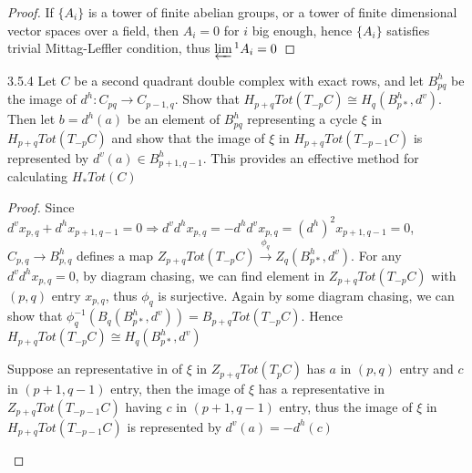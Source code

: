 \documentclass[../main.tex]{subfiles}
\begin{document}
\begin{proof}
If $\{A_i\}$ is a tower of finite abelian groups, or a tower of finite dimensional vector spaces over a field, then $A_i=0$ for $i$ big enough, hence $\{A_i\}$ satisfies trivial Mittag-Leffler condition, thus $\varprojlim\textstyle^1A_i=0$
\end{proof}

\begin{customexercise}{3.5.4}
Let $C$ be a second quadrant double complex with exact rows, and let $B^h_{pq}$ be the image of $d^h:C_{pq}\to C_{p-1,q}$. Show that $H_{p+q}Tot(T_{-p}C)\cong H_q(B^h_{p*},d^v)$. Then let $b=d^h(a)$ be an element of $B_{pq}^h$ representing a cycle $\xi$ in $H_{p+q}Tot(T_{-p}C)$ and show that the image of $\xi$ in $H_{p+q}Tot(T_{-p-1}C)$ is represented by $d^v(a)\in B^h_{p+1,q-1}$. This provides an effective method for calculating $H_*Tot(C)$
\end{customexercise}

\begin{proof}
Since $d^vx_{p,q}+d^hx_{p+1,q-1}=0\Rightarrow d^vd^hx_{p,q}=-d^hd^vx_{p,q}=(d^h)^2x_{p+1,q-1}=0$, $C_{p,q}\to B_{p,q}^h$ defines a map $Z_{p+q}Tot(T_{-p}C)\xrightarrow{\phi_q} Z_q(B^h_{p*},d^v)$. For any $d^vd^hx_{p,q}=0$, by diagram chasing, we can find element in $Z_{p+q}Tot(T_{-p}C)$ with $(p,q)$ entry $x_{p,q}$, thus $\phi_q$ is surjective. Again by some diagram chasing, we can show that $\phi_q^{-1}(B_q(B^h_{p*},d^v))=B_{p+q}Tot(T_{-p}C)$. Hence $H_{p+q}Tot(T_{-p}C)\cong H_q(B^h_{p*},d^v)$ \par
Suppose an representative in of $\xi$ in $Z_{p+q}Tot(T_pC)$ has $a$ in $(p,q)$ entry and $c$ in $(p+1,q-1)$ entry, then the image of $\xi$ has a representative in $Z_{p+q}Tot(T_{-p-1}C)$ having $c$ in $(p+1,q-1)$ entry, thus the image of $\xi$ in $H_{p+q}Tot(T_{-p-1}C)$ is represented by $d^v(a)=-d^h(c)$
\begin{center}
\end{center}
\end{proof}
\end{document}
